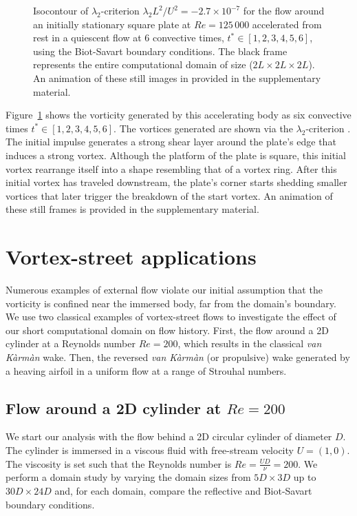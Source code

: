 \documentclass[preprint,12pt]{elsarticle}
\begin{document}
\begin{figure}
\begin{subfigure}{.33\textwidth}
    \end{subfigure}
    \caption{Isocontour of $\lambda_2$-criterion $\lambda_2L^2/U^2=-2.7\times10^{-7}$ for the flow around an initially stationary square plate at $Re=125\,000$ accelerated from rest in a quiescent flow at 6 convective times, $t^*\in [1,2,3,4,5,6]$, using the Biot-Savart boundary conditions. The black frame represents the entire computational domain of size ($2L\times2L\times2L$). An animation of these still images in provided in the supplementary material.}
    \label{fig:disk_flow_3}
\end{figure}

Figure~\ref{fig:disk_flow_3} shows the vorticity generated by this accelerating body as six convective times $t^*\in[1,2,3,4,5,6]$. The vortices generated are shown via the $\lambda_2$-criterion \cite{JEong1995OnVortex}. The initial impulse generates a strong shear layer around the plate's edge that induces a strong vortex. Although the platform of the plate is square, this initial vortex rearrange itself into a shape resembling that of a vortex ring. After this initial vortex has traveled downstream, the plate's corner starts shedding smaller vortices that later trigger the breakdown of the start vortex. An animation of these still frames is provided in the supplementary material.

\section{Vortex-street applications}

Numerous examples of external flow violate our initial assumption that the vorticity is confined near the immersed body, far from the domain's boundary. We use two classical examples of vortex-street flows to investigate the effect of our short computational domain on flow history. First, the flow around a 2D cylinder at a Reynolds number $Re=200$, which results in the classical \emph{van K\`arm\`an} wake. Then, the reversed \emph{van K\`arm\`an} (or propulsive) wake generated by a heaving airfoil in a uniform flow at a range of Strouhal numbers.

\subsection{Flow around a 2D cylinder at $Re=200$}

We start our analysis with the flow behind a 2D circular cylinder of diameter $D$. The cylinder is immersed in a viscous fluid with free-stream velocity $U=(1,0)$. The viscosity is set such that the Reynolds number is $Re=\frac{UD}{\nu}=200$. We perform a domain study by varying the domain sizes from $5D\times3D$ up to $30D\times24D$ and, for each domain, compare the reflective and Biot-Savart boundary conditions.
\end{document}
